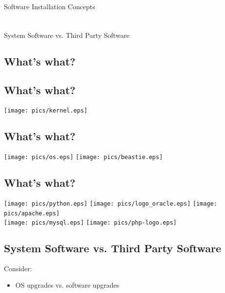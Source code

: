 \documentclass[xga]{xdvislides}
\begin{document}
\newpage
\vspace*{\fill}
\begin{center}
	\Hugesize
		Software Installation Concepts \\ [1em]
	\hspace*{5mm}
	\blueline\\
	\hspace*{5mm}\\
		System Software vs. Third Party Software
\end{center}
\vspace*{\fill}

\subsection{What's what?}
\subsection{What's what?}
\begin{center}
	\texttt{[image: pics/kernel.eps]}
\end{center}


\subsection{What's what?}
\begin{center}
	\texttt{[image: pics/os.eps]}
	\texttt{[image: pics/beastie.eps]}
\end{center}

\subsection{What's what?}
\begin{center}
	\texttt{[image: pics/python.eps]}
	\texttt{[image: pics/logo\_oracle.eps]}
	\texttt{[image: pics/apache.eps]} \\
	\texttt{[image: pics/mysql.eps]}
	\texttt{[image: pics/php-logo.eps]}
\end{center}




\subsection{System Software vs. Third Party Software}
Consider:
\begin{itemize}
	\item OS upgrades vs. software upgrades
\end{itemize}
\end{document}
